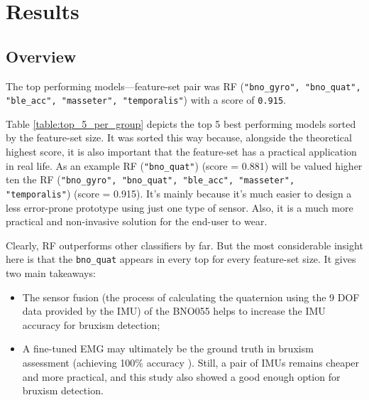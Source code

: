 \chapter{Results}

\section{Overview}

The top performing models---feature-set pair was RF (\texttt{"bno\_gyro", "bno\_quat", "ble\_acc", "masseter", "temporalis"}) with a score of \texttt{0.915}.

Table \ref{table:top_5_per_group} depicts the top 5 best performing models sorted by the feature-set size. It was sorted this way because, alongside the theoretical highest score, it is also important that the feature-set has a practical application in real life. As an example RF (\texttt{"bno\_quat"}) (score = 0.881) will be valued higher ten the RF (\texttt{"bno\_gyro", "bno\_quat", "ble\_acc", "masseter", "temporalis"}) (score = 0.915). It's mainly because it's much easier to design a less error-prone prototype using just one type of sensor. Also, it is a much more practical and non-invasive solution for the end-user to wear.

Clearly, RF outperforms other classifiers by far. But the most considerable insight here is that the \texttt{bno\_quat} appears in every top for every feature-set size. It gives two main takeaways:
\begin{itemize}
    \item The sensor fusion (the process of calculating the quaternion using the 9 DOF data provided by the IMU) of the BNO055 helps to increase the IMU accuracy for bruxism detection;
    \item A fine-tuned EMG may ultimately be the ground truth in bruxism assessment (achieving 100\% accuracy \cite{Sonmezocak2021}). Still, a pair of IMUs remains cheaper and more practical, and this study also showed a good enough option for bruxism detection.
\end{itemize}

